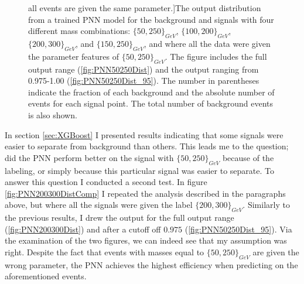 \begin{figure}
    all events are given the same parameter.]{The output distribution from a trained \ac{PNN} model for the background and signals with four different 
    mass combinations: $\{50,250\}_{GeV}$, $\{100,200\}_{GeV}$, $\{200,300\}_{GeV}$, and $\{150,250\}_{GeV}$, and where all the data were given the 
    parameter features of $\{50,250\}_{GeV}$. The figure includes the full output range (\ref{fig:PNN50250Dist}) 
    and the output ranging from 0.975-1.00 (\ref{fig:PNN50250Dist_95}). The number in parentheses indicate the fraction of each background and 
    the absolute number of events for each signal point. The total number of background events is also shown.}
    \label{fig:PNN50250}
\end{figure} 
In section \ref{sec:XGBoost} I presented results indicating that some signals were easier to separate from background than others. This leads me to the 
question; did the \ac{PNN} perform better on the signal with $\{50,250\}_{GeV}$ because of the labeling, or simply
because this particular signal was easier to separate. To answer this question I conducted a second test. In figure \ref{fig:PNN200300DistComp} 
I repeated the analysis described in the paragraphs above, but where all the signals were given the label $\{200,300\}_{GeV}$.
Similarly to the previous results, I drew the output for the full output range (\ref{fig:PNN200300Dist}) and after a cutoff off $0.975$ (\ref{fig:PNN50250Dist_95}).
Via the examination of the two figures, we can indeed see that my assumption was right. Despite the fact that events with masses equal to  $\{50,250\}_{GeV}$
are given the wrong parameter, the \ac{PNN} achieves the highest efficiency when predicting on the aforementioned events. \\
